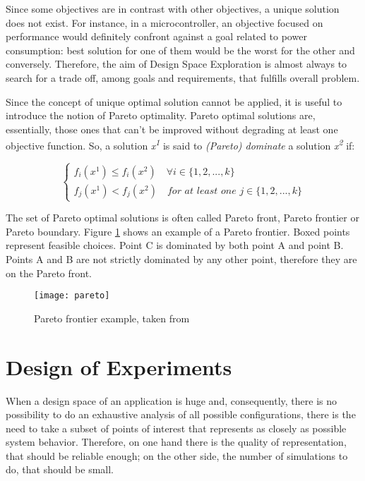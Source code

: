 Since some objectives are in contrast with other objectives, a unique solution does not exist. For instance, in a microcontroller, an objective focused on performance would definitely confront against a goal related to power consumption: best solution for one of them would be the worst for the other and conversely. Therefore, the aim of Design Space Exploration is almost always to search for a trade off, among goals and requirements, that fulfills overall problem.

Since the concept of unique optimal solution cannot be applied, it is useful to introduce the notion of Pareto optimality. Pareto optimal solutions are, essentially, those ones that can't be improved without degrading at least one objective function. So, a solution \textit{x\textsuperscript{1}} is said to \textit{(Pareto) dominate} a solution \textit{x\textsuperscript{2}} if:

\begin{equation}
\begin{cases}
        f_i(x^1) \le f_i(x^2) \quad \forall i \in \{1, 2, ..., k\} \\
        f_j(x^1) < f_j(x^2) \quad \textit{for at least one } j \in \{1, 2, ..., k\}
\end{cases}
\end{equation}

The set of Pareto optimal solutions is often called Pareto front, Pareto frontier or Pareto boundary. Figure \ref{fig::pareto} shows an example of a Pareto frontier. Boxed points represent feasible choices. Point C is dominated by both point A and point B. Points A and B are not strictly dominated by any other point, therefore they are on the Pareto front.

\begin{figure}[htb]

    \centering
    \texttt{[image: pareto]}
    \caption[Pareto frontier example]{Pareto frontier example, taken from \cite{wiki:pareto}}
    \label{fig::pareto}

\end{figure}





\section{Design of Experiments}\label{doe}

When a design space of an application is huge and, consequently, there is no possibility to do an exhaustive analysis of all possible configurations, there is the need to take a subset of points of interest that represents as closely as possible system behavior. Therefore, on one hand there is the quality of representation, that should be reliable enough; on the other side, the number of simulations to do, that should be small.


